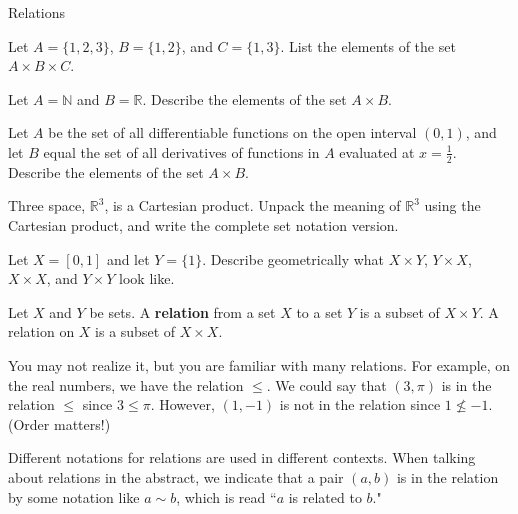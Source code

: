 \begin{section}{Relations}
\begin{exercise} 
Let $A=\{1, 2, 3\}$, $B=\{1,2\}$, and $C=\{1,3\}$. List the elements of the set $A \times B\times C$. 
\end{exercise}

\begin{exercise}
Let $A=\mathbb{N}$ and $B=\mathbb{R}$. Describe the elements of the set $A \times B$. 
\end{exercise}

\begin{exercise} Let $A$ be the set of all differentiable functions on the open interval $(0,1)$, and let $B$ equal the set of all derivatives of functions in $A$ evaluated at $x=\frac{1}{2}$. Describe the elements of the set $A \times B$. \end{exercise}

\begin{exercise}
Three space, $\mathbb{R}^{3}$, is a Cartesian product.  Unpack the meaning of $\mathbb{R}^{3}$ using the Cartesian product, and write the complete set notation version.
\end{exercise}

\begin{exercise}
Let $X=[0,1]$ and let $Y=\{1\}$.  Describe geometrically what $X\times Y$, $Y\times X$, $X\times X$, and $Y\times Y$ look like.
\end{exercise}

\begin{definition}
Let $X$ and $Y$ be sets. A \textbf{relation} from a set $X$ to a set $Y$ is a subset of $X \times Y$. A relation on $X$ is a subset of $X \times X$.  
\end{definition}

\begin{example}
You may not realize it, but you are familiar with many relations.  For example, on the real numbers, we have the relation $\leq$.  We could say that $(3,\pi)$ is in the relation $\leq$ since $3\leq \pi$.  However, $(1,-1)$ is not in the relation since $1\nleq -1$.  (Order matters!)
\end{example}

\begin{remark}
Different notations for relations are used in different contexts.  When talking about relations in the abstract, we indicate that a pair $(a,b)$ is in the relation by some notation like $a\sim b$, which is read ``$a$ is related to $b$."
\end{remark}


\end{section}
